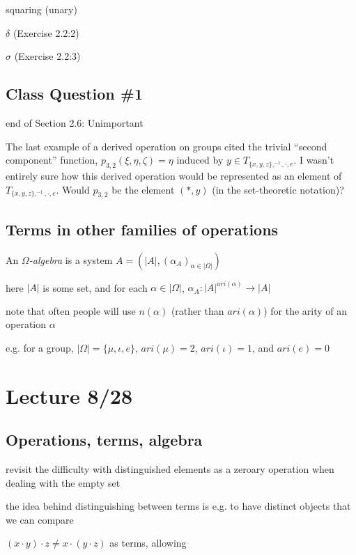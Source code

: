 \documentclass[12pt]{article}
\begin{document}
squaring (unary)

$\delta$ (Exercise 2.2:2)

$\sigma$ (Exercise 2.2:3)

\subsection{Class Question \#1}

end of Section 2.6:
Unimportant

The last example of a derived operation on groups cited the trivial ``second component'' function, $p_{3, 2}(\xi, \eta, \zeta) = \eta$ induced by $y \in T_{\{x, y, z\}, ^{-1}, \cdot, e}$.  I wasn't entirely sure how this derived operation would be represented as an element of $T_{\{x, y, z\}, ^{-1}, \cdot, e}$.  Would $p_{3, 2}$ be the element $(*, y)$ (in the set-theoretic notation)?

\subsection{Terms in other families of operations}

\noindent
An \textit{$\Omega$-algebra} is a system $A = (|A|, (\alpha_A)_{\alpha \in |\Omega|})$

here $|A|$ is some set, and for each $\alpha \in |\Omega|$, $\alpha_A : |A|^{ari(\alpha)} \to |A|$

note that often people will use $n(\alpha)$ (rather than $ari(\alpha)$) for the arity of an operation $\alpha$

e.g. for a group, $|\Omega| = \{\mu, \iota, e\}$, $ari(\mu) = 2$, $ari(\iota) = 1$, and $ari(e) = 0$

\section{Lecture 8/28}

\subsection{Operations, terms, algebra}

revisit the difficulty with distinguished elements as a zeroary operation when dealing with the empty set

the idea behind distinguishing between terms is e.g. to have distinct objects that we can compare

$(x \cdot y) \cdot z \neq x \cdot (y \cdot z)$ as terms, allowing
\end{document}
